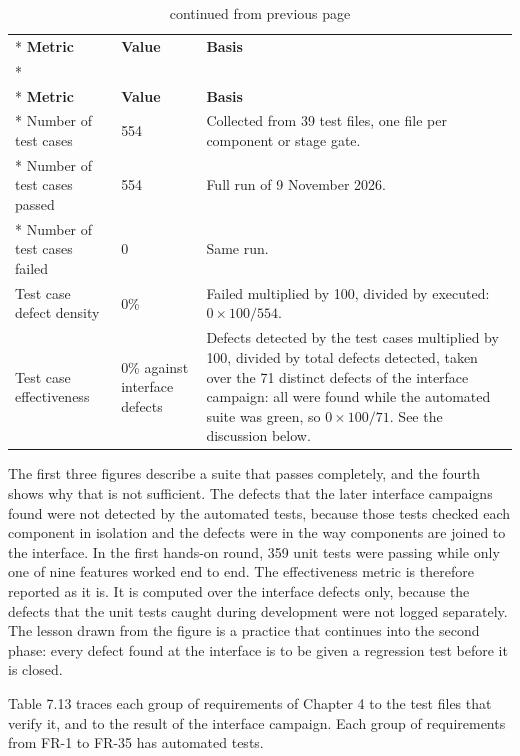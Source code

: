 \documentclass{FastFyp}
\begin{document}
{
\begin{longtable}{|p{4.6cm}|p{2.0cm}|p{6.6cm}|}
\caption{Test metrics.}\label{tab:metrics}\\*
\hline
\textbf{Metric} & \textbf{Value} & \textbf{Basis} \\*
\hline
\endfirsthead
\caption[]{continued from previous page}\\*
\hline
\textbf{Metric} & \textbf{Value} & \textbf{Basis} \\*
\hline
\endhead
\hline
Number of test cases & 554 & Collected from 39 test files, one file per component or stage gate. \\*
\hline
Number of test cases passed & 554 & Full run of 9 November 2026. \\*
\hline
Number of test cases failed & 0 & Same run. \\
\hline
Test case defect density & 0\% & Failed multiplied by 100, divided by executed: $0 \times 100 / 554$. \\
\hline
Test case effectiveness & 0\% against interface defects & Defects detected by the test cases multiplied by 100, divided by total defects detected, taken over the 71 distinct defects of the interface campaign: all were found while the automated suite was green, so $0 \times 100 / 71$. See the discussion below. \\
\hline
\end{longtable}
}

The first three figures describe a suite that passes completely, and the fourth shows why that is not sufficient. The defects that the later interface campaigns found were not detected by the automated tests, because those tests checked each component in isolation and the defects were in the way components are joined to the interface. In the first hands-on round, 359 unit tests were passing while only one of nine features worked end to end. The effectiveness metric is therefore reported as it is. It is computed over the interface defects only, because the defects that the unit tests caught during development were not logged separately. The lesson drawn from the figure is a practice that continues into the second phase: every defect found at the interface is to be given a regression test before it is closed.

Table 7.13 traces each group of requirements of Chapter 4 to the test files that verify it, and to the result of the interface campaign. Each group of requirements from FR-1 to FR-35 has automated tests.
\end{document}
